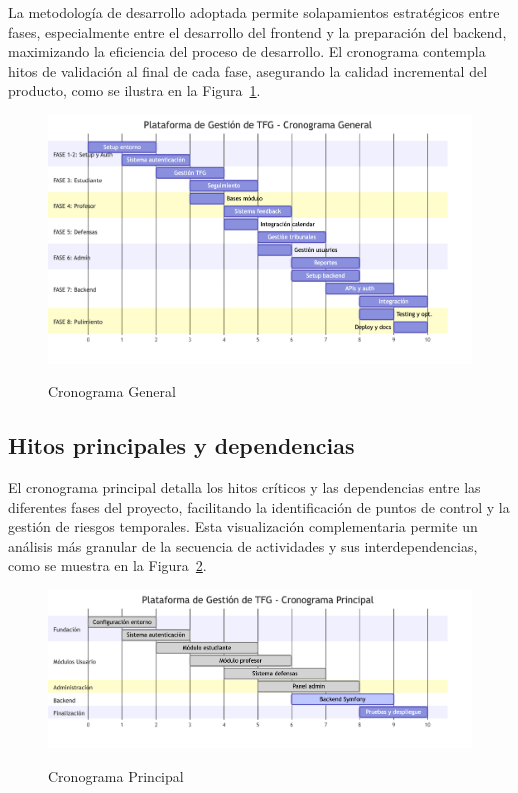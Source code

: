 \documentclass[12pt,a4paper,oneside]{report}
\providecommand{\pandocbounded}[1]{#1}
\begin{document}
La metodología de desarrollo adoptada permite solapamientos estratégicos entre fases, especialmente entre el desarrollo del frontend y la preparación del backend, maximizando la eficiencia del proceso de desarrollo. El cronograma contempla hitos de validación al final de cada fase, asegurando la calidad incremental del producto, como se ilustra en la Figura~\ref{fig:cronograma-general}.

\begin{figure}[H]
\centering
\pandocbounded{\includegraphics[keepaspectratio,alt={Cronograma General}]{processed/images/03_planificacion_mermaid_0.png}}
\caption{Cronograma General}
\label{fig:cronograma-general}
\end{figure}

\subsection{Hitos principales y
dependencias}\label{hitos-principales-y-dependencias}

El cronograma principal detalla los hitos críticos y las dependencias entre las diferentes fases del proyecto, facilitando la identificación de puntos de control y la gestión de riesgos temporales. Esta visualización complementaria permite un análisis más granular de la secuencia de actividades y sus interdependencias, como se muestra en la Figura~\ref{fig:cronograma-principal}.

\begin{figure}[H]
\centering
\pandocbounded{\includegraphics[keepaspectratio,alt={Cronograma Principal}]{processed/images/03_planificacion_mermaid_1.png}}
\caption{Cronograma Principal}
\label{fig:cronograma-principal}
\end{figure}
\end{document}
